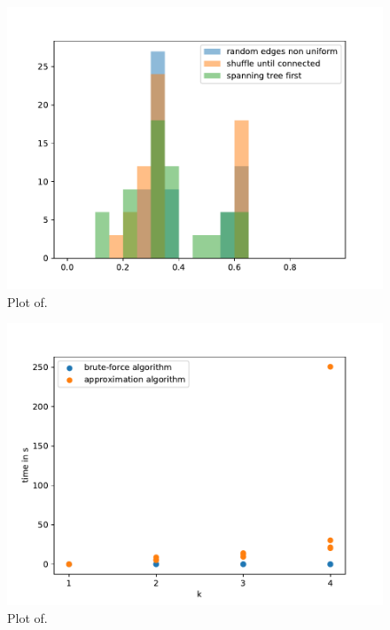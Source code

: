 \begin{figure}
	\centering
	\includegraphics[scale=1]{figures/creation_algorithm_log_lowest_expansion.pdf}
	\caption[Plot ]{Plot of.}
\end{figure}

\begin{figure}
	\centering
	\includegraphics[scale=1]{figures/k_all_logs.pdf}
	\caption[Plot ]{Plot of.}
\end{figure}

